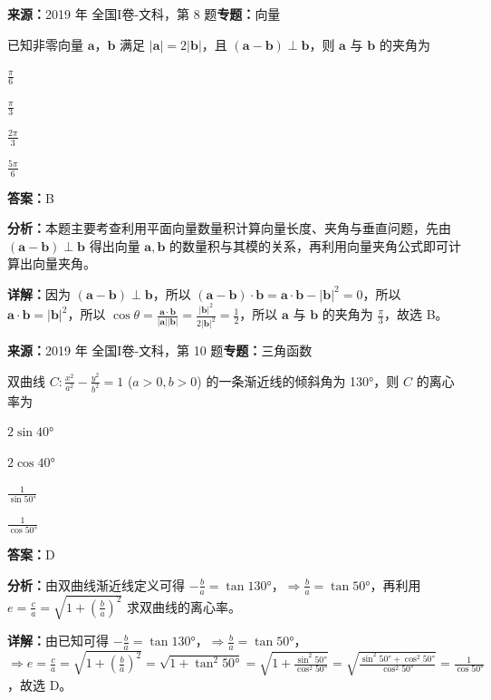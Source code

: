 \begin{question}[points=5]
\textbf{来源：}2019 年 全国I卷-文科，第 8 题\quad \textbf{专题：}向量\par
已知非零向量 $\boldsymbol{a}$，$\boldsymbol{b}$ 满足 $|\boldsymbol{a}|=2|\boldsymbol{b}|$，且 $(\boldsymbol{a}-\boldsymbol{b}) \perp \boldsymbol{b}$，则 $\boldsymbol{a}$ 与 $\boldsymbol{b}$ 的夹角为
\begin{choices}
  \item $\frac{\pi}{6}$
  \item $\frac{\pi}{3}$
  \item $\frac{2\pi}{3}$
  \item $\frac{5\pi}{6}$
\end{choices}
\begin{solution}
\textbf{答案：}B

\textbf{分析：}本题主要考查利用平面向量数量积计算向量长度、夹角与垂直问题，先由 $(\boldsymbol{a}-\boldsymbol{b}) \perp \boldsymbol{b}$ 得出向量 $\boldsymbol{a},\boldsymbol{b}$ 的数量积与其模的关系，再利用向量夹角公式即可计算出向量夹角。

\textbf{详解：}因为 $(\boldsymbol{a}-\boldsymbol{b}) \perp \boldsymbol{b}$，所以 $(\boldsymbol{a}-\boldsymbol{b})\cdot\boldsymbol{b} = \boldsymbol{a}\cdot\boldsymbol{b} - |\boldsymbol{b}|^2 = 0$，所以 $\boldsymbol{a}\cdot\boldsymbol{b} = |\boldsymbol{b}|^2$，所以 $\cos\theta = \frac{\boldsymbol{a}\cdot\boldsymbol{b}}{|\boldsymbol{a}||\boldsymbol{b}|} = \frac{|\boldsymbol{b}|^2}{2|\boldsymbol{b}|^2} = \frac{1}{2}$，所以 $\boldsymbol{a}$ 与 $\boldsymbol{b}$ 的夹角为 $\frac{\pi}{3}$，故选 B。
\end{solution}
\end{question}

\begin{question}[points=5]
\textbf{来源：}2019 年 全国I卷-文科，第 10 题\quad \textbf{专题：}三角函数\par
双曲线 $C: \frac{x^2}{a^2} - \frac{y^2}{b^2} = 1$ ($a>0,b>0$) 的一条渐近线的倾斜角为 130°，则 $C$ 的离心率为
\begin{choices}
  \item $2\sin40°$
  \item $2\cos40°$
  \item $\frac{1}{\sin50°}$
  \item $\frac{1}{\cos50°}$
\end{choices}
\begin{solution}
\textbf{答案：}D

\textbf{分析：}由双曲线渐近线定义可得 $-\frac{b}{a} = \tan130°$，$\Rightarrow \frac{b}{a} = \tan50°$，再利用 $e = \frac{c}{a} = \sqrt{1+\left(\frac{b}{a}\right)^2}$ 求双曲线的离心率。

\textbf{详解：}由已知可得 $-\frac{b}{a} = \tan130°$，$\Rightarrow \frac{b}{a} = \tan50°$，$\Rightarrow e = \frac{c}{a} = \sqrt{1+\left(\frac{b}{a}\right)^2} = \sqrt{1+\tan^2 50°} = \sqrt{1+\frac{\sin^2 50°}{\cos^2 50°}} = \sqrt{\frac{\sin^2 50°+\cos^2 50°}{\cos^2 50°}} = \frac{1}{\cos50°}$，故选 D。
\end{solution}
\end{question}


